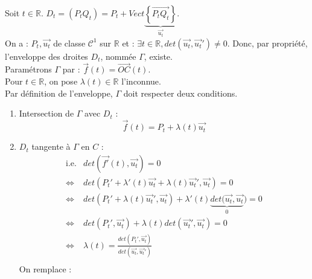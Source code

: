 Soit $t \in \mathbb{R}$.
$D_t = (P_tQ_t) = P_t + Vect \underbrace{\left\{\overrightarrow{P_tQ_t}\right\}}_{\overrightarrow{u_t}}$. \\
On a : $P_t, \overrightarrow{u_t}$ de classe $\mathcal{C}^1$ sur $\mathbb{R}$ et : $\exists t\in\mathbb{R}, det(\overrightarrow{u_t}, \overrightarrow{u_t}')\neq0$. Donc, par propriété, l'enveloppe des droites $D_t$, nommée $\Gamma$, existe.\\
Paramétrons $\Gamma$ par : $\overrightarrow{f}(t) = \overrightarrow{OC}(t) $.\\
Pour $t \in\mathbb{R}$, on pose $\lambda(t)\in\mathbb{R}$ l'inconnue.\\
Par définition de l'enveloppe, $\Gamma$ doit respecter deux conditions.
\begin{enumerate}[label=\arabic*. ]
  \item Intersection de $\Gamma$ avec $D_t$ :
        \[
          \overrightarrow{f}(t) = P_t + \lambda(t)\overrightarrow{u_t}
        \]
  \item $D_t$ tangente à $\Gamma$ en $C$ :
        \[
          \begin{array}{rl}
            \text{i.e.} & det(\overrightarrow{f'}(t), \overrightarrow{u_t}) = 0                                                    \\
            \iff        & det(
            P_t' + \lambda'(t)\overrightarrow{u_t} + \lambda(t)\overrightarrow{u_t}'
            , \overrightarrow{u_t}
            ) = 0                                                                                                                  \\
            \iff        & det(
            P_t' + \lambda(t)\overrightarrow{u_t}'
            , \overrightarrow{u_t}
            ) + \lambda'(t)\underbrace{det(
              \overrightarrow{u_t}
              , \overrightarrow{u_t}}_{0}
            ) = 0                                                                                                                  \\
            \iff        & det(
            P_t', \overrightarrow{u_t})
            + \lambda(t)det(\overrightarrow{u_t}', \overrightarrow{u_t}) = 0                                                       \\
            \iff        & \lambda(t) = \frac{det(P_t',  \overrightarrow{u_t})}{det( \overrightarrow{u_t},  \overrightarrow{u_t}')} \\
          \end{array}
        \]
        On remplace :

\end{enumerate}
